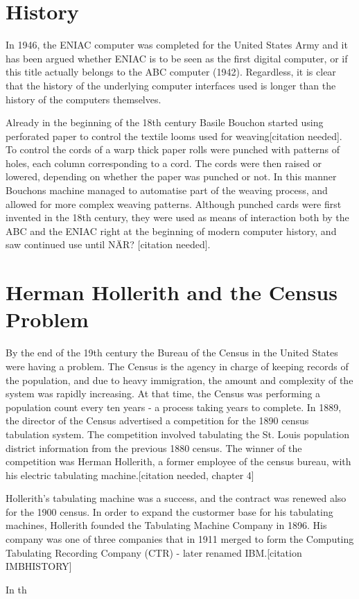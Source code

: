 \section{History}
In 1946, the ENIAC computer was completed for the United States Army and it has been argued whether ENIAC is to be seen as the first digital computer\cite{McCartney1999}, or if this title actually belongs to the ABC computer (1942)\cite{court}. Regardless, it is clear that the history of the underlying computer interfaces used is longer than the history of the computers themselves.

Already in the beginning of the 18th century Basile Bouchon started using perforated paper to control the textile looms used for weaving[citation needed]. To control the cords of a warp thick paper rolls were punched with patterns of holes, each column corresponding to a cord. The cords were then raised or lowered, depending on whether the paper was punched or not. In this manner Bouchons machine managed to automatise part of the weaving process, and allowed for more complex weaving patterns. Although punched cards were first invented in the 18th century, they were used as means of interaction both by the ABC and the ENIAC right at the beginning of modern computer history, and saw continued use until NÄR? [citation needed].



\section{Herman Hollerith and the Census Problem}
By the end of the 19th century the Bureau of the Census in the United States were having a problem. The Census is the agency in charge of keeping records of the population, and due to heavy immigration, the amount and complexity of the system was rapidly increasing. At that time, the Census was performing a population count every ten years - a process taking years to complete. In 1889, the director of the Census advertised a competition for the 1890 census tabulation system. The competition involved tabulating the St. Louis population district information from the previous 1880 census. The winner of the competition was Herman Hollerith, a former employee of the census bureau, with his electric tabulating machine.[citation needed, chapter 4]

Hollerith's tabulating machine was a success, and the contract was renewed also for the 1900 census. In order to expand the custormer base for his tabulating machines, Hollerith founded the Tabulating Machine Company in 1896. His company was one of three companies that in 1911 merged to form the Computing Tabulating Recording Company (CTR) - later renamed IBM.[citation IMBHISTORY]

In th


